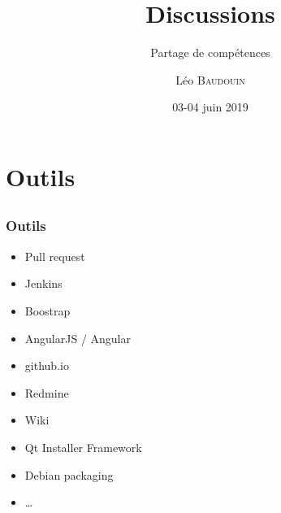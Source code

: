 \documentclass{beamer}
\title{Discussions}
\subtitle{Partage de compétences}
\author{L\'eo \textsc{Baudouin}}
\institute{
  {\url{baudouin.leo @ gmail.com}}
}
\date{03-04 juin 2019}
\begin{document}
\begin{frame}
  \titlepage
\end{frame}




\section{Outils}
\subsection{}

\begin{frame}
  \frametitle{Outils}
  \begin{block}{}
  \begin{itemize}[<+->]
  \item Pull request
  \item Jenkins
  \item Boostrap
  \item AngularJS / Angular
  \item github.io
  \item Redmine
  \item Wiki
  \item Qt Installer Framework
  \item Debian packaging
  \item \dots
  \end{itemize}
  \end{block}  
\end{frame}

\end{document}

